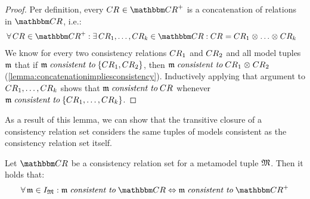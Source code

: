 \begin{proof}
    Per definition, every $\consistencyrelation{CR}{} \in \transitiveclosure{\consistencyrelationset{CR}}$ is a concatenation of relations in $\consistencyrelationset{CR}$, i.e.:
    \begin{align*}
        &
        \forall \consistencyrelation{CR}{} \in \transitiveclosure{\consistencyrelationset{CR}} : \exists \consistencyrelation{CR}{1}, \dots, \consistencyrelation{CR}{k} \in \consistencyrelationset{CR} :
        \consistencyrelation{CR}{} = \consistencyrelation{CR}{1} \concat \dots \concat \consistencyrelation{CR}{k}
    \end{align*}
    We know for every two consistency relations $\consistencyrelation{CR}{1}$ and $\consistencyrelation{CR}{2}$ and all model tuples $\modeltuple{m}$ that if $\modeltuple{m} \consistenttomath \setted{\consistencyrelation{CR}{1}, \consistencyrelation{CR}{2}}$, then $\modeltuple{m} \consistenttomath \consistencyrelation{CR}{1} \concat \consistencyrelation{CR}{2}$ (\autoref{lemma:concatenationimpliesconsistency}).
    Inductively applying that argument to $\consistencyrelation{CR}{1}, \dots, \consistencyrelation{CR}{k}$ shows that $\modeltuple{m} \consistenttomath \consistencyrelation{CR}{}$ whenever $\modeltuple{m} \consistenttomath \setted{\consistencyrelation{CR}{1}, \dots, \consistencyrelation{CR}{k}}$.
\end{proof}

As a result of this lemma, we can show that the transitive closure of a consistency relation set considers the same tuples of models consistent as the consistency relation set itself.

\begin{lemma} \label{lemma:consistencytransitiveclosure}
    Let $\consistencyrelationset{CR}$ be a consistency relation set for a metamodel tuple $\metamodeltuple{M}$.
    Then it holds that:
    \begin{align*}
        \forall \modeltuple{m} \in \metamodeltupleinstanceset{M}: \modeltuple{m} \consistenttomath \consistencyrelationset{CR} \equivalent
        \modeltuple{m} \consistenttomath \transitiveclosure{\consistencyrelationset{CR}}
    \end{align*}
\end{lemma}

